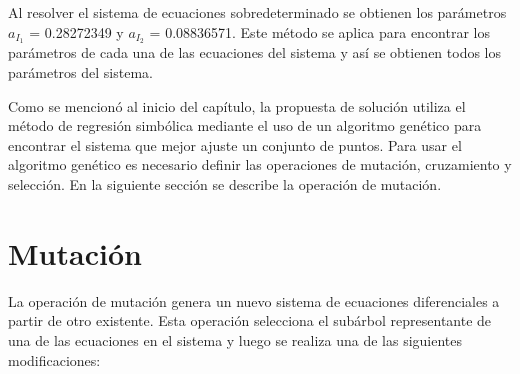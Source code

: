 Al resolver el sistema de ecuaciones sobredeterminado se obtienen los parámetros $a_{I_1}$ = 0.28272349 y $a_{I_2}$ = 0.08836571. Este método se aplica para encontrar los parámetros de cada una de las ecuaciones del sistema y así se obtienen todos los parámetros del sistema.

Como se mencionó al inicio del capítulo, la propuesta de solución utiliza el método de regresión simbólica mediante el uso de un algoritmo genético para encontrar el sistema que mejor ajuste un conjunto de puntos. Para usar el algoritmo genético es necesario definir las operaciones de mutación, cruzamiento y selección. En la siguiente sección se describe la operación de mutación.

\section{Mutación}\label{section:mutation}

La operación de mutación genera un nuevo sistema de ecuaciones diferenciales a partir de otro existente. Esta operación selecciona el subárbol representante de una de las ecuaciones en el sistema y luego se realiza una de las siguientes modificaciones:

